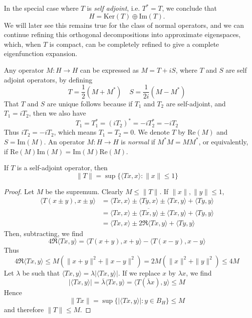 In the special case where $T$ is \emph{self adjoint}, i.e. $T^* = T$, we conclude that
%
\[ H = \text{Ker}(T) \oplus \text{Im}(T). \]
%
We will later see this remains true for the class of normal operators, and we can continue refining this orthogonal decompositions into approximate eigenspaces, which, when $T$ is compact, can be completely refined to give a complete eigenfunction expansion.

Any operator $M: H \to H$ can be expressed as $M = T + iS$, where $T$ and $S$ are self adjoint operators, by defining
%
\[ T = \frac{1}{2}(M + M^*)\ \ \ \ \ S = \frac{1}{2i}(M - M^*) \]
%
That $T$ and $S$ are unique follows because if $T_1$ and $T_2$ are self-adjoint, and $T_1 = iT_2$, then we also have
%
\[ T_1 = T_1^* = (iT_2)^* = -i T_2^* = -iT_2 \]
%
Thus $iT_2 = -iT_2$, which means $T_1 = T_2 = 0$. We denote $T$ by $\text{Re}(M)$ and $S = \text{Im}(M)$. An operator $M: H \to H$ is \emph{normal} if $M^* M = MM^*$, or equivalently, if $\text{Re}(M) \text{Im}(M) = \text{Im}(M) \text{Re}(M)$.

\begin{theorem}
    If $T$ is a self-adjoint operator, then
    \[ \| T \| = \sup \{ \langle Tx, x \rangle: \| x \| \leq 1 \} \]
\end{theorem}
\begin{proof}
    Let $M$ be the supremum. Clearly $M \leq \| T \|$. If $\| x \|, \| y \| \leq 1$,
    \begin{align*}
        \langle T(x \pm y), x \pm y \rangle &= \langle Tx, x \rangle \pm \langle Ty, x \rangle \pm \langle Tx, y \rangle + \langle Ty, y \rangle\\
        &= \langle Tx, x \rangle \pm \overline{\langle Tx, y \rangle} \pm \langle Tx, y \rangle + \langle Ty, y \rangle\\
        &= \langle Tx, x \rangle \pm 2 \Re \langle Tx, y \rangle + \langle Ty, y \rangle
    \end{align*}
    Then, subtracting, we find
    \[ 4\Re \langle Tx, y \rangle = \langle T(x+y),x+y \rangle - \langle T(x - y), x - y \rangle \]
    Thus
    \[ 4 \Re \langle Tx, y \rangle \leq M(\|x + y\|^2 + \|x - y\|^2) = 2M(\|x\|^2 + \|y\|^2) \leq 4M \]
    Let $\lambda$ be such that $\langle Tx, y \rangle = \lambda |\langle Tx, y \rangle|$. If we replace $x$ by $\lambda x$, we find
    \[ |\langle Tx, y \rangle| = \overline{\lambda} \langle Tx, y \rangle = \langle T(\overline{\lambda}x), y \rangle \leq M \]
    Hence
    \[ \| Tx \| = \sup \{ |\langle Tx, y \rangle| : y \in B_H \} \leq M \]
    and therefore $\| T \| \leq M$.
\end{proof}

